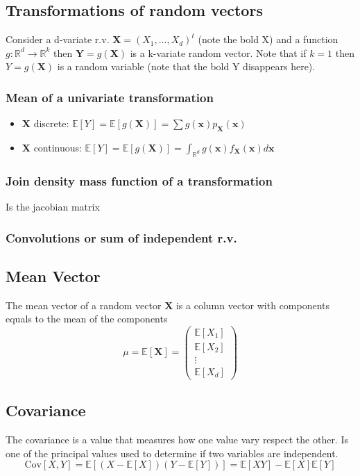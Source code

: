 \subsection{Transformations of random vectors}
Consider a d-variate r.v. $\textbf{X}=(X_1,\dots,X_d)^t$ (note the bold X) and a
function $g:\mathbb{R}^d \rightarrow \mathbb{R}^k$ then
$\textbf{Y}=g(\textbf{X})$ is a k-variate random vector. Note that if $k=1$ then
$Y=g(\textbf{X})$ is a random variable (note that the bold Y disappears here).
\subsubsection{Mean of a univariate transformation}
\begin{itemize}
    \item $\textbf{X}$ discrete: $\mathbb{E}[Y]=\mathbb{E}[g(\textbf{X})]=\sum
    g(\textbf{x})p_\textbf{X}(\textbf{x})$
    \item $\textbf{X}$ continuous:
    $\mathbb{E}[Y]=\mathbb{E}[g(\textbf{X})]=\int_{\mathbb{R}^d}
    g(\textbf{x})f_\textbf{X}(\textbf{x})d\textbf{x}$
\end{itemize}
\subsubsection{Join density mass function of a transformation}
Is the jacobian matrix

\subsubsection{Convolutions or sum of independent r.v.}

\subsection{Mean Vector}
The mean vector of a random vector $\textbf{X}$ is a column vector with
components equals to the mean of the components
\[ \mu = \mathbb{E}[\textbf{X}] = 
\begin{pmatrix}
    \mathbb{E}[X_1]\\\mathbb{E}[X_2]\\\vdots\\\mathbb{E}[X_d]
\end{pmatrix}
\]

\subsection{Covariance}
The covariance is a value that measures how one value vary respect the other. Is
one of the principal values used to determine if two variables are independent.
\[ \text{Cov}[X,Y] = \mathbb{E}[(X-\mathbb{E}[X])(Y-\mathbb{E}[Y])] =
\mathbb{E}[XY]-\mathbb{E}[X]\mathbb{E}[Y] \]


